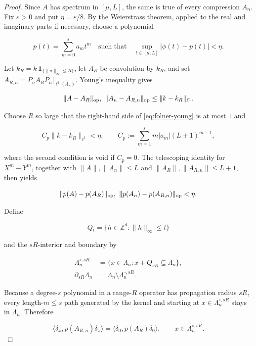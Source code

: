 \begin{proof}
Since \(A\) has spectrum in \([\mu,L]\), the same is true of every compression
\(A_n\). Fix \(\varepsilon>0\) and put \(\eta=\varepsilon/8\). By the
Weierstrass theorem, applied to the real and imaginary parts if necessary,
choose a polynomial

\[
p(t)=\sum_{m=0}^{s}a_mt^m
\quad\text{such that}\quad
\sup_{t\in[\mu,L]}|\phi(t)-p(t)|<\eta.
\]

Let \(k_R=k\,\mathbf 1_{\{\|u\|_\infty\le R\}}\), let \(A_R\) be convolution
by \(k_R\), and set \(A_{R,n}=P_nA_RP_n|_{\ell^2(\Lambda_n)}\). Young's
inequality gives

\begin{equation}\label{eq:folner-young}
\|A-A_R\|_{\rm op},\ \|A_n-A_{R,n}\|_{\rm op}
\le\|k-k_R\|_{\ell^1}.
\end{equation}

Choose \(R\) so large that the right-hand side of
\eqref{eq:folner-young} is at most \(1\) and

\[
C_p\|k-k_R\|_{\ell^1}<\eta,\qquad
C_p:=\sum_{m=1}^{s}m|a_m|(L+1)^{m-1},
\]

where the second condition is void if \(C_p=0\). The telescoping identity for
\(X^m-Y^m\), together with
\(\|A\|,\|A_n\|\le L\) and
\(\|A_R\|,\|A_{R,n}\|\le L+1\), then yields

\begin{equation}\label{eq:folner-polynomial-truncation}
\|p(A)-p(A_R)\|_{\rm op},
\ \|p(A_n)-p(A_{R,n})\|_{\rm op}<\eta.
\end{equation}

Define

\[
Q_t=\{h\in\mathbb Z^d:\|h\|_\infty\le t\}
\]

and the \(sR\)-interior and boundary by

\begin{align*}
\Lambda_n^{\circ,sR}
&=\{x\in\Lambda_n:x+Q_{sR}\subseteq\Lambda_n\},\\
\partial_{sR}\Lambda_n
&=\Lambda_n\setminus\Lambda_n^{\circ,sR}.
\end{align*}

Because a degree-\(s\) polynomial in a range-\(R\) operator has propagation
radius \(sR\), every length-\(m\le s\) path generated by the kernel and
starting at \(x\in\Lambda_n^{\circ,sR}\) stays in \(\Lambda_n\). Therefore

\begin{equation}\label{eq:folner-interior-equality}
\langle\delta_x,p(A_{R,n})\delta_x\rangle
=\langle\delta_0,p(A_R)\delta_0\rangle,
\qquad x\in\Lambda_n^{\circ,sR}.
\end{equation}


\end{proof}
